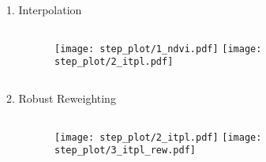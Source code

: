 




\begin{frame}[t]{1. Interpolation}
    \begin{columns}
        \begin{column}{0.45\textwidth}

        \end{column}
        \begin{column}{0.45\textwidth}
            \begin{figure}
                \vspace{-1.6cm}
                \texttt{[image: step\_plot/1\_ndvi.pdf]}
                \texttt{[image: step\_plot/2\_itpl.pdf]}
            \end{figure}
        \end{column}
    \end{columns}
\end{frame}

\begin{frame}[t]{2. Robust Reweighting}
    \begin{columns}
        \begin{column}{0.45\textwidth}

        \end{column}
        \begin{column}{0.45\textwidth}
            \begin{figure}
                \vspace{-1.6cm}
                \texttt{[image: step\_plot/2\_itpl.pdf]}
                \texttt{[image: step\_plot/3\_itpl\_rew.pdf]}
            \end{figure}
        \end{column}
    \end{columns}
\end{frame}

